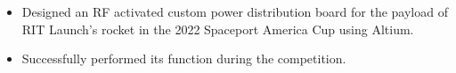 \documentclass[]{deedy-resume-openfont}
\begin{document}
\begin{minipage}[t]{0.66\textwidth}
\sectionsep

\begin{itemize}
    \setlength\itemsep{0pt}
    \item Designed an RF activated custom power distribution board for the payload of RIT Launch's rocket in the 2022 Spaceport America Cup using Altium.
    \item Successfully performed its function during the competition.    
\end{itemize}





\sectionsep


\end{minipage}
\end{document}

